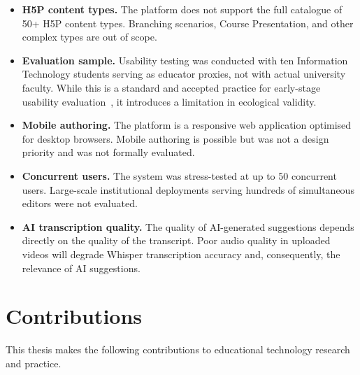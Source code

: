 \begin{itemize}
  \item \textbf{H5P content types.} The platform does not support the full
  catalogue of 50+ H5P content types. Branching scenarios, Course
  Presentation, and other complex types are out of scope.

  \item \textbf{Evaluation sample.} Usability testing was conducted with
  ten Information Technology students serving as educator proxies, not with
  actual university faculty. While this is a standard and accepted practice
  for early-stage usability evaluation~\cite{nielsen1994}, it introduces a
  limitation in ecological validity.

  \item \textbf{Mobile authoring.} The platform is a responsive web
  application optimised for desktop browsers. Mobile authoring is possible
  but was not a design priority and was not formally evaluated.

  \item \textbf{Concurrent users.} The system was stress-tested at up to
  50 concurrent users. Large-scale institutional deployments serving
  hundreds of simultaneous editors were not evaluated.

  \item \textbf{AI transcription quality.} The quality of AI-generated
  suggestions depends directly on the quality of the transcript. Poor audio
  quality in uploaded videos will degrade Whisper transcription accuracy and,
  consequently, the relevance of AI suggestions.
\end{itemize}

\section{Contributions}

This thesis makes the following contributions to educational technology
research and practice.

